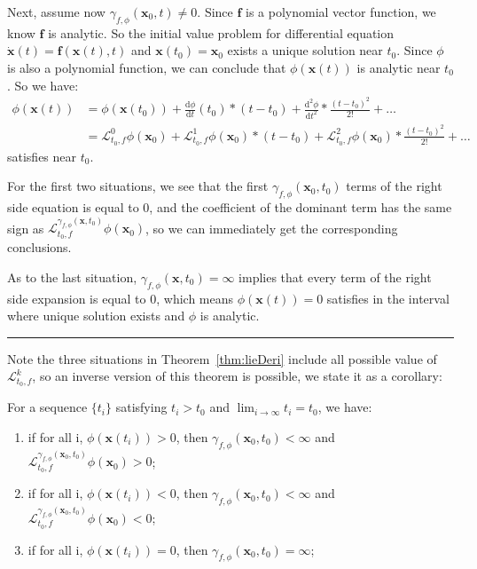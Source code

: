 \documentclass{jssc}
\newcommand{\rulex}{\hfill\rule{1mm}{3mm}}
\begin{document}
Next, assume now $\gamma_{f, \phi}(\boldsymbol{x}_0, t) \neq 0$. Since $\boldsymbol{f}$ is a polynomial vector function, we know $\boldsymbol{f}$ is analytic. So the initial value problem for differential equation $\dot{\boldsymbol{x}}(t) = \boldsymbol{f}(\boldsymbol{x}(t),t)$ and $\boldsymbol{x}(t_0) = \boldsymbol{x}_0$ exists a unique solution near $t_0$\cite{tenenbaum1963ordinary}. Since $\phi$ is also a polynomial function, we can conclude that $\phi(\boldsymbol{x}(t))$ is analytic near $t_0$. So we have:
	\begin{equation*}
		\begin{split}
		\phi(\boldsymbol{x}(t)) &= \phi(\boldsymbol{x}(t_0)) + \frac{\mathrm{d} \phi}{\mathrm{d}t}(t_0) * (t-t_0) + \frac{\mathrm{d}^2 \phi}{\mathrm{d}t^2} * \frac{(t-t_0)^2}{2!} + \dots \\
							&= {\mathcal{L}_{t_0, f}^0 \phi(\boldsymbol{x}_0)} + \mathcal{L}_{t_0, f}^1 \phi(\boldsymbol{x}_0) * (t-t_0) + \mathcal{L}_{t_0, f}^2 \phi(\boldsymbol{x}_0) * \frac{(t-t_0)^2}{2!} + \dots
		\end{split}
	\end{equation*}
satisfies near $t_0$.

For the first two situations, we see that the first $\gamma_{f, \phi}(\boldsymbol{x}_0, t_0)$ terms of the right side equation is equal to 0, and the coefficient of the dominant term has the same sign as $\mathcal{L}_{t_0, f}^{\gamma_{f, \phi}(\boldsymbol{x}, t_0)} \phi (\boldsymbol{x}_0)$, so we can immediately get the corresponding conclusions.

As to the last situation, $\gamma_{f, \phi}(\boldsymbol{x}, t_0) = \infty$ implies that every term of the right side expansion is equal to 0, which means $\phi (\boldsymbol{x}(t)) =0$ satisfies in the interval where unique solution exists and $\phi$ is analytic.
\rulex \newline

Note the three situations in Theorem~\ref{thm:lieDeri} include all possible value of $\mathcal{L}_{t_0, f}^{k}$, so an inverse version of this theorem is possible, we state it as a corollary:

\begin{corollary}
\label{cor:lieDeri}
For a sequence $\{ t_i \}$  satisfying $t_i > t_0$ and $\lim_{i \to \infty} t_i = t_0$, we have:
\begin{enumerate}
	\item if for all i, $\phi(\boldsymbol{x}(t_i)) > 0$, then $\gamma_{f, \phi}(\boldsymbol{x}_0, t_0) < \infty$ and $\mathcal{L}_{t_0, f}^{\gamma_{f, \phi}(\boldsymbol{x}_0, t_0)} \phi (\boldsymbol{x}_0) > 0$;
	\item if for all i, $\phi(\boldsymbol{x}(t_i)) < 0$, then $\gamma_{f, \phi}(\boldsymbol{x}_0, t_0) < \infty$ and $\mathcal{L}_{t_0, f}^{\gamma_{f, \phi}(\boldsymbol{x}_0, t_0)} \phi (\boldsymbol{x}_0) < 0$;
	\item if for all i, $\phi(\boldsymbol{x}(t_i)) = 0$, then $\gamma_{f, \phi}(\boldsymbol{x}_0, t_0) = \infty$;
\end{enumerate}
\end{corollary}
\end{document}
